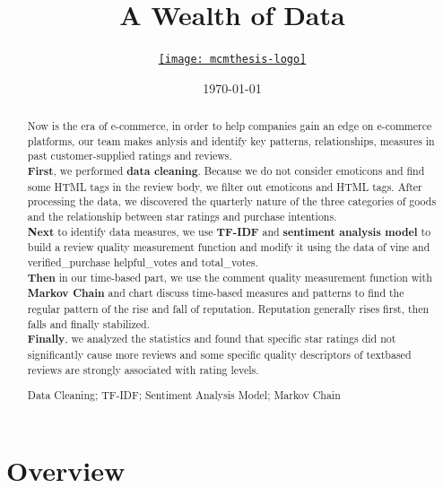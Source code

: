 \documentclass[12pt]{mcmthesis}
\title{A Wealth of Data}
\author{\small \href{http://www.latexstudio.net/}
  {\texttt{[image: mcmthesis-logo]}}}
\date{\today}
\begin{document}
\begin{abstract}
	\par Now is the era of e-commerce, in order to help companies gain an edge on e-commerce platforms, our team makes anlysis and identify key patterns, relationships, measures in past customer-supplied ratings and reviews.\\
	\indent \textbf{First}, we performed \textbf{data cleaning}. Because we do not consider emoticons  and find some HTML tags in the review body, we filter out emoticons and HTML tags. After processing the data, we discovered the quarterly nature of the three categories of goods and the relationship between star ratings and purchase intentions.\\
	\indent \textbf{Next} to identify data measures, we use \textbf{TF-IDF} and \textbf{sentiment analysis model} to build a review quality measurement function and modify it using the data of  vine  and verified\_purchase helpful\_votes and total\_votes.\\
	\indent \textbf{Then} in our time-based part, we use the comment quality measurement function with \textbf{Markov Chain} and chart discuss time-based measures and patterns to find the regular pattern of the rise and fall of reputation.  Reputation generally rises first, then falls and finally stabilized.\\
	\indent \textbf{Finally}, we analyzed the statistics and found that specific star ratings did not significantly cause more reviews and some specific quality descriptors of textbased reviews are strongly associated with rating levels.
\begin{keywords}
Data Cleaning; TF-IDF; Sentiment Analysis Model; Markov Chain
\end{keywords}
\end{abstract}
\maketitle
\tableofcontents
\newpage

\section{Overview}
\end{document}
